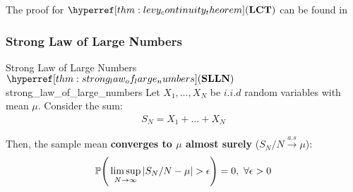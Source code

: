 \begin{proof*}
    The proof for $\LCT$ can be found in \cite[Section 9.1, Theorem 9.1 and Collorary 9.1]{book:allen2004}
\end{proof*}

\subsubsection{Strong Law of Large Numbers}
\begin{theorem}{Strong Law of Large Numbers $\SLLN$}{strong_law_of_large_numbers}
    Let $X_1, \dots, X_N$ be $i.i.d$ random variables with mean $\mu$. Consider the sum:
    \begin{align*}
        S_N = X_1 + \dots + X_N
    \end{align*}

    \noindent Then, the sample mean \textbf{converges to $\mu$ almost surely} ($S_N/N\xrightarrow{a.s}\mu$):
    \begin{align}
        \mathbb{P}\Bigg( 
            \limsup_{N\to\infty}|S_N/N - \mu| > \epsilon
         \Bigg) = 0, \ \forall \epsilon > 0
    \end{align}
\end{theorem}

\begin{proof*}
    
\end{proof*}
